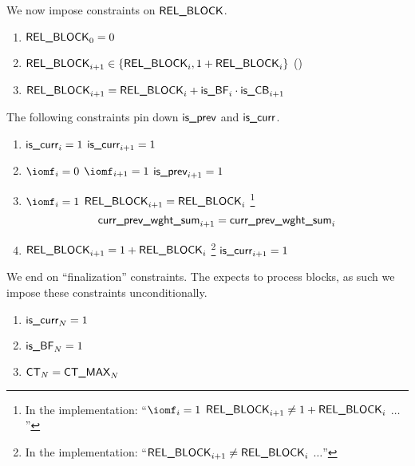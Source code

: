 We now impose constraints on $\textsf{REL\_BLOCK}$.
\begin{enumerate}[resume]
	\item $\textsf{REL\_BLOCK} _{0} = 0$
	\item $\textsf{REL\_BLOCK}_{i + 1} \in \{ \textsf{REL\_BLOCK}_{i}, 1 + \textsf{REL\_BLOCK}_{i} \}$ \quad (\sanityCheck)
	\item $\textsf{REL\_BLOCK} _{i + 1} = \textsf{REL\_BLOCK} _{i} + \textsf{is\_BF} _{i} \cdot \textsf{is\_CB} _{i + 1}$
\end{enumerate}
The following constraints pin down $\textsf{is\_prev}$ and $\textsf{is\_curr}$.
\begin{enumerate}[resume]
	\item \If $\textsf{is\_curr} _{i} = 1$ \Then $\textsf{is\_curr} _{i + 1} = 1$
	\item \If $\iomf _{i} = 0$ \et $\iomf _{i + 1} = 1$ \Then $\textsf{is\_prev} _{i + 1} = 1$
	\item \If $\iomf _{i} = 1$ \et $\textsf{REL\_BLOCK} _{i + 1} = \textsf{REL\_BLOCK} _{i}$%
		\footnote{In the implementation: ``\If $\iomf_{i} = 1$ \et $\textsf{REL\_BLOCK} _{i + 1} \neq 1 + \textsf{REL\_BLOCK} _{i}$ \Then $\dots$''}
		\Then
		\[ \textsf{curr\_prev\_wght\_sum} _{i + 1} = \textsf{curr\_prev\_wght\_sum} _{i} \]
	\item \If $\textsf{REL\_BLOCK} _{i + 1} = 1 + \textsf{REL\_BLOCK} _{i}$%
		\footnote{In the implementation: ``\If $\textsf{REL\_BLOCK} _{i + 1} \neq \textsf{REL\_BLOCK} _{i}$ \Then $\dots$''}
		\Then $\textsf{is\_curr} _{i + 1} = 1$
\end{enumerate}
We end on ``finalization'' constraints.
The \zkEvm{} expects to process blocks, as such we impose these constraints unconditionally.
\begin{enumerate}[resume]
	\item $\textsf{is\_curr} _{N} = 1$
	\item $\textsf{is\_BF}  _{N} = 1$
	\item $\textsf{CT} _{N} = \textsf{CT\_MAX} _{N}$
\end{enumerate}
